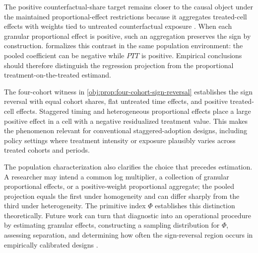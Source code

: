The positive counterfactual-share target remains closer to the causal object under the maintained proportional-effect restrictions because it aggregates treated-cell effects with weights tied to untreated counterfactual exposure \citep{MoreauKastler2025PTT}. When each granular proportional effect is positive, such an aggregation preserves the sign by construction.  formalizes this contrast in the same population environment: the pooled coefficient can be negative while \(PTT\) is positive. Empirical conclusions should therefore distinguish the regression projection from the proportional treatment-on-the-treated estimand.

The four-cohort witness in \cref{obj:prop:four-cohort-sign-reversal} establishes the sign reversal with equal cohort shares, flat untreated time effects, and positive treated-cell effects. Staggered timing and heterogeneous proportional effects place a large positive effect in a cell with a negative residualized treatment value. This makes the phenomenon relevant for conventional staggered-adoption designs, including policy settings where treatment intensity or exposure plausibly varies across treated cohorts and periods.

The population characterization also clarifies the choice that precedes estimation. A researcher may intend a common log multiplier, a collection of granular proportional effects, or a positive-weight proportional aggregate; the pooled projection equals the first under homogeneity and can differ sharply from the third under heterogeneity. The primitive index \(\Phi\) establishes this distinction theoretically. Future work can turn that diagnostic into an operational procedure by estimating granular effects, constructing a sampling distribution for \(\Phi\), assessing separation, and determining how often the sign-reversal region occurs in empirically calibrated designs \citep{SantosSilvaTenreyro2006,SantosSilvaTenreyro2011,CorreiaGuimaraesZylkin2020,Wooldridge2023NonlinearDiD,NagengastYotov2025}.
